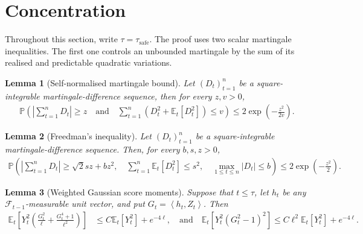 \documentclass[11pt]{article}
\newtheorem{lemma}[lemma]{Lemma}
\newcommand{\E}{\mathbb E}
\newcommand{\Pp}{\mathbb P}
\newcommand{\F}{\mathcal F}
\newcommand{\1}{\mathbf 1}
\newcommand{\ip}[2]{\left\langle #1,#2\right\rangle}
\begin{document}
\section{Concentration}
\label{app:concentration}
Throughout this section, write $\tau=\tau_{\mathrm{safe}}$.
The proof uses two scalar martingale inequalities.  The first one controls an
unbounded martingale by the sum of its realised and predictable quadratic
variations.

\begin{lemma}[Self-normalised martingale bound]
    \label{lem:self-normalised-martingale}
    Let $(D_t)_{t=1}^n$ be a square-integrable martingale-difference sequence, then for every $z,v>0$,
    \begin{align}
        \Pp\left(
        \left|\sum_{t=1}^n D_t\right|\geq z\quad\text{and}\quad
        \sum_{t=1}^n \left(D_t^2+\E_t[D_t^2]\right)\leq v
        \right)
        \leq
        2\exp\left(-\frac{z^2}{2v}\right).
        \label{eq:self-normalised-martingale}
    \end{align}
\end{lemma}

\begin{lemma}[Freedman's inequality]
    \label{lem:freedman}
    Let $(D_t)_{t=1}^n$ be a square-integrable
    martingale-difference sequence. Then, for every $b,s,z>0$,
    \begin{align}
        \Pp\left(
        \left|\sum_{t=1}^n D_t\right|
        \geq \sqrt{2}s z+bz^2,
        \quad
        \sum_{t=1}^n\E_t[D_t^2]\leq s^2,
        \quad
        \max_{1\leq t\leq n}|D_t|\leq b
        \right)
        \leq
        2\exp\left(-\frac{z^2}{2}\right).
    \end{align}
\end{lemma}

\begin{lemma}[Weighted Gaussian score moments]
    \label{lem:gaussian-score-localisation}
    Suppose that $t\leq\tau$, let $h_t$ be any
    $\F_{t-1}$-measurable unit vector, and put
    $G_t=\ip{h_t}{Z_t}$. Then
    \begin{align}
        \E_t\left[
            Y_t^2\left(
            \frac{G_t^2}{\ell}
            +\frac{G_t^4+1}{\ell^2}
            \right)
            \right]
         & \leq
        C\E_t[Y_t^2]+e^{-4\ell},
        \quad\text{and}\quad
        \E_t\left[
            Y_t^2(G_t^2-1)^2
            \right]
        \leq
        C\ell^2\E_t[Y_t^2]+e^{-4\ell}.
        \label{eq:H-score-second-moment}
    \end{align}
\end{lemma}
\end{document}

